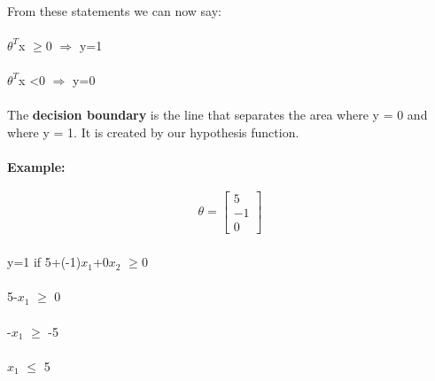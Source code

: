 \documentclass[UTF8]{ctexart}
\begin{document}
\paragraph{}
From these statements we can now say:
\paragraph{}
\begin{algorithm}
\paragraph{}
$\theta^{T}$x $\geq$0 $\Rightarrow$ y=1
\paragraph{}
$\theta^{T}$x <0 $\Rightarrow$ y=0
\end{algorithm}
\paragraph{}
The \textbf{decision boundary} is the line that separates the area where y = 0 and where y = 1. It is created by our hypothesis function.
\paragraph{}
\textbf{Example:}
\begin{algorithm}
\begin{eqnarray*}
\theta=\left[\begin{array}{r}
5\\
-1\\
0
\end{array}\right]
\end{eqnarray*}
\paragraph{}
y=1 if 5+(-1)$x_{1}$+0$x_{2}$ $\geq$0
\paragraph{}
5-$x_{1}$ $\geq$ 0
\paragraph{}
-$x_{1}$ $\geq$ -5
\paragraph{}
$x_{1}$ $\leqslant$ 5
\end{algorithm}
\end{document}
